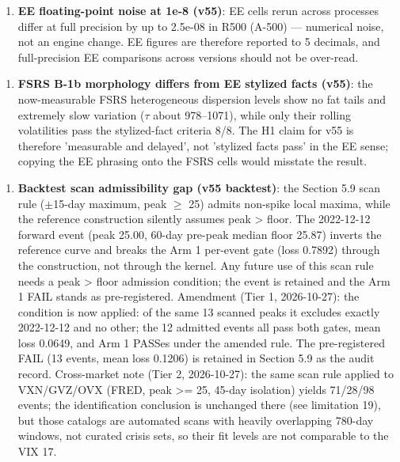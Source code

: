 \documentclass[11pt]{article}
\begin{document}
\begin{enumerate}
\item \textbf{EE floating-point noise at 1e-8 (v55)}: EE cells rerun across processes differ at full precision by up to 2.5e-08 in R500 (A-500) --- numerical noise, not an engine change. EE figures are therefore reported to 5 decimals, and full-precision EE comparisons across versions should not be over-read.
\end{enumerate}

\begin{enumerate}
\item \textbf{FSRS B-1b morphology differs from EE stylized facts (v55)}: the now-measurable FSRS heterogeneous dispersion levels show no fat tails and extremely slow variation ($\tau$ about 978--1071), while only their rolling volatilities pass the stylized-fact criteria 8/8. The H1 claim for v55 is therefore 'measurable and delayed', not 'stylized facts pass' in the EE sense; copying the EE phrasing onto the FSRS cells would misstate the result.
\end{enumerate}

\begin{enumerate}
\item \textbf{Backtest scan admissibility gap (v55 backtest)}: the Section 5.9 scan rule ($\pm$15-day maximum, peak $\geq$ 25) admits non-spike local maxima, while the reference construction silently assumes peak > floor. The 2022-12-12 forward event (peak 25.00, 60-day pre-peak median floor 25.87) inverts the reference curve and breaks the Arm 1 per-event gate (loss 0.7892) through the construction, not through the kernel. Any future use of this scan rule needs a peak > floor admission condition; the event is retained and the Arm 1 FAIL stands as pre-registered. Amendment (Tier 1, 2026-10-27): the condition is now applied: of the same 13 scanned peaks it excludes exactly 2022-12-12 and no other; the 12 admitted events all pass both gates, mean loss 0.0649, and Arm 1 PASSes under the amended rule. The pre-registered FAIL (13 events, mean loss 0.1206) is retained in Section 5.9 as the audit record. Cross-market note (Tier 2, 2026-10-27): the same scan rule applied to VXN/GVZ/OVX (FRED, peak >= 25, 45-day isolation) yields 71/28/98 events; the identification conclusion is unchanged there (see limitation 19), but those catalogs are automated scans with heavily overlapping 780-day windows, not curated crisis sets, so their fit levels are not comparable to the VIX 17.
\end{enumerate}
\end{document}
